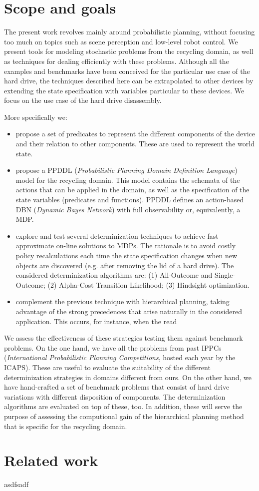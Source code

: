 \documentclass[../root.tex]{subfiles}
\begin{document}
\section{Scope and goals}

The present work revolves mainly around probabilistic planning, without focusing too much
on topics such as scene perception and low-level robot control.
We present tools for modeling stochastic problems from the recycling
domain, as well as techniques for
dealing efficiently with these problems. Although all the examples and benchmarks
have been conceived for the particular use case of the hard drive,
the techniques described here can be extrapolated to other devices by extending
the state specification with variables particular to these devices.
We focus on the use case of the
hard drive disassembly.

More specifically we:
\begin{itemize}
	\item propose a set of predicates to represent the different components of
	the device and their relation to other components. These are used to represent
	the world state.
	\item propose a PPDDL (\emph{Probabilistic Planning Domain Definition Language})
	model for the recycling domain. This model contains the schemata of the actions
	that can be applied in the domain, as well as the specification of the
	state variables (predicates and functions). PPDDL defines an action-based
	DBN (\emph{Dynamic Bayes Network}) with full observability or, equivalently,
	a MDP.
	\item explore and test several determinization techniques to achieve fast
	approximate on-line solutions to MDPs. The rationale is to avoid costly policy
	recalculations each time the state specification changes when new objects
	are discovered (e.g. after removing the lid of a hard drive). The considered
	determinization algorithms are: (1) All-Outcome and Single-Outcome;
	(2) Alpha-Cost Transition Likelihood; (3) Hindsight optimization.
	\item complement the previous technique with hierarchical planning, taking
	advantage of the strong precedences that arise naturally in the
	considered application. This occurs, for instance, when the read
\end{itemize}

We assess the effectiveness of these strategies testing them against
benchmark problems. On the one hand, we have all the problems from past
IPPCs
(\emph{International Probabilistic Planning Competitions}, hosted
each year by the ICAPS). These are useful to evaluate the suitability of
the different
determinization strategies in domains different from ours. On the other hand,
we have hand-crafted a set of benchmark problems that consist of
hard drive variations with different disposition of components. The determinization
algorithms are evaluated on top of these, too. In addition, these will serve
the purpose of assessing the computional gain of the hierarchical planning
method that is specific for the recycling domain.

\section{Related work}

asdfsadf

\end{document}
